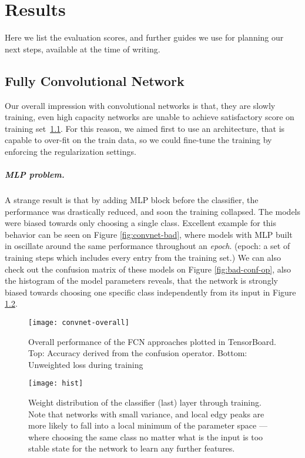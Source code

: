 \chapter{Results}
Here we list the evaluation scores, and further guides we use for planning our next steps, available at the time of writing.

\section{Fully Convolutional Network}
Our overall impression with convolutional networks is that, they are slowly training, even high capacity networks are unable to achieve satisfactory score on training set~\ref{fig:convnet-overall}. For this reason, we aimed first to use an architecture, that is capable to over-fit on the train data, so we could fine-tune the training by enforcing the regularization settings.
\paragraph{MLP problem.}
A strange result is that by adding MLP block before the classifier, the performance was drastically reduced, and soon the training collapsed.
The models were biased towards only choosing a single class.
Excellent example for this behavior can be seen on Figure \ref{fig:convnet-bad}, where models with MLP built in oscillate around the same performance throughout an \textit{epoch}. (epoch: a set of training steps which includes every entry from the training set.)
We can also check out the confusion matrix of these models
on Figure \ref{fig:bad-conf-op}, also the histogram of the model parameters reveals, that the network is strongly biased towards choosing one specific class independently from its input in Figure \ref{fig:hist-op}.

\begin{figure}[h]
  \centering
  \texttt{[image: convnet-overall]}
  \caption{Overall performance of the FCN approaches plotted in TensorBoard. Top: Accuracy derived from the confusion operator. Bottom: Unweighted loss during training}
  \label{fig:convnet-overall}
\end{figure}

\begin{figure}
  \centering
  \texttt{[image: hist]}
  \caption{Weight distribution of the classifier (last) layer through training. Note that networks with small variance, and local edgy peaks are more likely to fall into a local minimum of the parameter space --- where choosing the same class no matter what is the input is too stable state for the network to learn any further features.}
  \label{fig:hist-op}
\end{figure}

